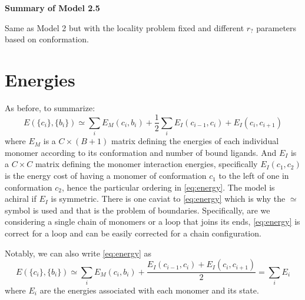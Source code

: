 \documentclass[11pt]{article}
\newcommand\set[1]{\ensuremath{\{#1\}}}
\begin{document}
\begin{center}
    \LARGE
    \textbf{Summary of Model 2.5}
    \vspace{1em}
\end{center}

Same as Model 2 but with the locality problem fixed and different $r_?$ parameters based on conformation.

\section{Energies}\label{sec:energies}
As before, to summarize:
\begin{equation}\label{eq:energy}
    E(\set{c_i}, \set{b_i}) \simeq \sum_i E_M(c_i, b_i) + \frac{1}{2} \sum_i E_I(c_{i-1}, c_i) + E_I(c_i, c_{i+1})
\end{equation}
where $E_M$ is a $C{\times}(B+1)$ matrix defining the energies of each individual monomer according to its conformation and number of bound ligands.
And $E_I$ is a $C{\times}C$ matrix defining the monomer interaction energies, specifically $E_I(c_1, c_2)$ is the energy cost of having a monomer of conformation $c_1$ to the left of one in conformation $c_2$, hence the particular ordering in \cref{eq:energy}.
The model is achiral if $E_I$ is symmetric.
There is one caviat to \cref{eq:energy} which is why the $\simeq$ symbol is used and that is the problem of boundaries.
Specifically, are we considering a single chain of monomers or a loop that joins its ends, \cref{eq:energy} is correct for a loop and can be easily corrected for a chain configuration.

Notably, we can also write \cref{eq:energy} as
\begin{equation}\label{eq:energy_ind}
    E(\set{c_i}, \set{b_i}) \simeq \sum_i E_M(c_i, b_i) + \frac{E_I(c_{i-1}, c_i) + E_I(c_i, c_{i+1})}{2} = \sum_i E_{i}
\end{equation}
where $E_i$ are the energies associated with each monomer and its state.
\end{document}
